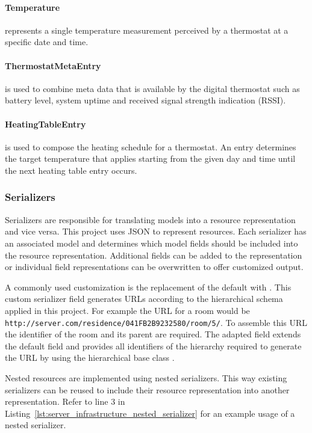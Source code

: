 \paragraph{Temperature} represents a single temperature measurement perceived by a thermostat at a specific date and time.

\paragraph{ThermostatMetaEntry} is used to combine meta data that is available by the digital thermostat such as battery level, system uptime and received signal strength indication (RSSI).

\paragraph{HeatingTableEntry} is used to compose the heating schedule for a thermostat.
An entry determines the target temperature that applies starting from the given day and time until the next heating table entry occurs.

\subsubsection{Serializers}
\label{sec:server_infrastructure_serializers}

Serializers are responsible for translating models into a resource representation and vice versa.
This project uses JSON to represent resources.
Each serializer has an associated model and determines which model fields should be included into the resource representation.
Additional fields can be added to the representation or individual field representations can be overwritten to offer customized output.

A commonly used customization is the replacement of the default  with .
This custom serializer field generates URLs according to the hierarchical schema applied in this project.
For example the URL for a room would be \nolinkurl{http://server.com/residence/041FB2B9232580/room/5/}.
To assemble this URL the identifier of the room and its parent are required.
The adapted field extends the default field and provides all identifiers of the hierarchy required to generate the URL by using the hierarchical base class .

Nested resources are implemented using nested serializers.
This way existing serializers can be reused to include their resource representation into another representation. Refer to line 3 in Listing~\ref{lst:server_infrastructure_nested_serializer} for an example usage of a nested serializer.

